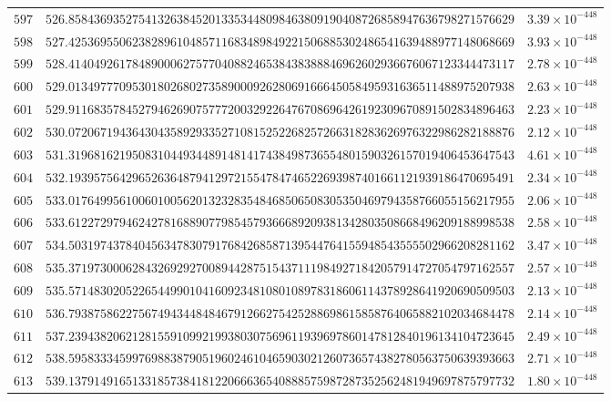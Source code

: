 \documentclass[12pt,reqno]{amsart}
\theoremstyle{remark}
\begin{document}
\begin{longtable}{clc}
$597$ & $526.8584369352754132638452013353448098463809190408726858947636798271576629$ & $3.39\times 10^{-448}$ \\
$598$ & $527.4253695506238289610485711683489849221506885302486541639488977148068669$ & $3.93\times 10^{-448}$ \\
$599$ & $528.4140492617848900062757704088246538438388846962602936676067123344473117$ & $2.78\times 10^{-448}$ \\
$600$ & $529.0134977709530180268027358900092628069166645058495931636511488975207938$ & $2.63\times 10^{-448}$ \\
$601$ & $529.9116835784527946269075777200329226476708696426192309670891502834896463$ & $2.23\times 10^{-448}$ \\
$602$ & $530.0720671943643043589293352710815252268257266318283626976322986282188876$ & $2.12\times 10^{-448}$ \\
$603$ & $531.3196816219508310449344891481417438498736554801590326157019406453647543$ & $4.61\times 10^{-448}$ \\
$604$ & $532.1939575642965263648794129721554784746522693987401661121939186470695491$ & $2.34\times 10^{-448}$ \\
$605$ & $533.0176499561006010056201323283548468506508305350469794358766055156217955$ & $2.06\times 10^{-448}$ \\
$606$ & $533.6122729794624278168890779854579366689209381342803508668496209188998538$ & $2.58\times 10^{-448}$ \\
$607$ & $534.5031974378404563478307917684268587139544764155948543555502966208281162$ & $3.47\times 10^{-448}$ \\
$608$ & $535.3719730006284326929270089442875154371119849271842057914727054797162557$ & $2.57\times 10^{-448}$ \\
$609$ & $535.5714830205226544990104160923481080108978318606114378928641920690509503$ & $2.13\times 10^{-448}$ \\
$610$ & $536.7938758622756749434484846791266275425288698615858764065882102034684478$ & $2.14\times 10^{-448}$ \\
$611$ & $537.2394382062128155910992199380307569611939697860147812840196134104723645$ & $2.49\times 10^{-448}$ \\
$612$ & $538.5958333459976988387905196024610465903021260736574382780563750639393663$ & $2.71\times 10^{-448}$ \\
$613$ & $539.1379149165133185738418122066636540888575987287352562481949697875797732$ & $1.80\times 10^{-448}$ \\

\end{longtable}
\end{document}
